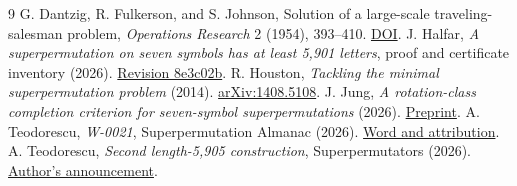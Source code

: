 \documentclass[11pt]{article}
\begin{document}
\begin{thebibliography}{9}\small\setlength{\itemsep}{1pt}
 G. Dantzig, R. Fulkerson, and S. Johnson, Solution of a large-scale traveling-salesman problem, \emph{Operations Research} 2 (1954), 393--410. \href{https://doi.org/10.1287/opre.2.4.393}{DOI}.
 J. Halfar, \emph{A superpermutation on seven symbols has at least 5,901 letters}, proof and certificate inventory (2026). \href{https://github.com/jhalfar/superpermutations/tree/8e3c02b5234b49a1422751f86f9e472706082374/proofs/n7_5901}{Revision 8e3c02b}.
 R. Houston, \emph{Tackling the minimal superpermutation problem} (2014). \href{https://arxiv.org/abs/1408.5108}{arXiv:1408.5108}.
 J. Jung, \emph{A rotation-class completion criterion for seven-symbol superpermutations} (2026). \href{https://github.com/aistaralchemist-cyber/superpermutation-completion-7/blob/4a98a9ae38cd6ec82c0ee0622a49419c3d98d453/seven-symbol-completion.pdf}{Preprint}.
 A. Teodorescu, \emph{W-0021}, Superpermutation Almanac (2026). \href{https://superpermutations.com/w/W-0021}{Word and attribution}.
 A. Teodorescu, \emph{Second length-5,905 construction}, Superpermutators (2026). \href{https://groups.google.com/g/superpermutators/c/D5sKkV2jBuc/m/MYVQA8UsAQAJ}{Author's announcement}.
\end{thebibliography}
\end{document}
